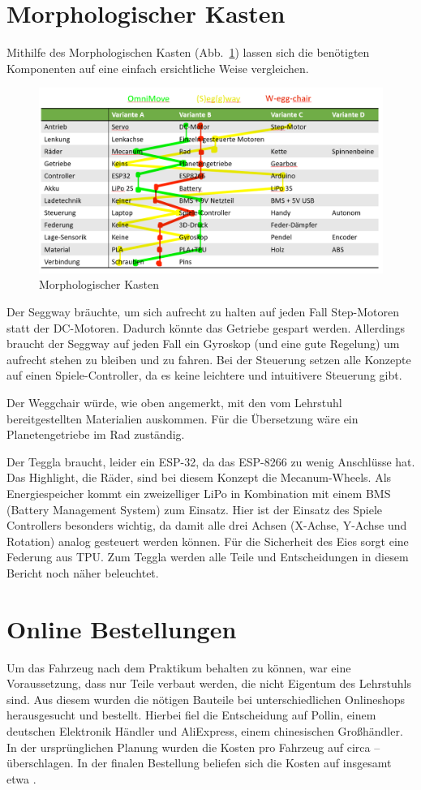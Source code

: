 \section{Morphologischer Kasten}
Mithilfe des Morphologischen Kasten (Abb.~\ref{bild:morphkasten}) lassen sich die benötigten Komponenten auf eine einfach ersichtliche Weise vergleichen.
\begin{figure}[H]
	\centering
	\includegraphics[width=\textwidth]{bilder/morphkasten.png}
	\caption{Morphologischer Kasten}
	\label{bild:morphkasten}
\end{figure}
Der Seggway bräuchte, um sich aufrecht zu halten auf jeden Fall Step-Motoren statt der DC-Motoren. Dadurch könnte das Getriebe gespart werden. Allerdings braucht der Seggway auf jeden Fall ein Gyroskop (und eine gute Regelung) um aufrecht stehen zu bleiben und zu fahren. Bei der Steuerung setzen alle Konzepte auf einen Spiele-Controller, da es keine leichtere und intuitivere Steuerung gibt.

Der Weggchair würde, wie oben angemerkt, mit den vom Lehrstuhl bereitgestellten Materialien auskommen. Für die Übersetzung wäre ein Planetengetriebe im Rad zuständig. 

Der Teggla braucht, leider ein ESP-32, da das ESP-8266 zu wenig Anschlüsse hat. Das Highlight, die Räder, sind bei diesem Konzept die Mecanum-Wheels. Als Energiespeicher kommt ein zweizelliger LiPo in Kombination mit einem BMS (Battery Management System) zum Einsatz. Hier ist der Einsatz des Spiele Controllers besonders wichtig, da damit alle drei Achsen (X-Achse, Y-Achse und Rotation) analog gesteuert werden können. Für die Sicherheit des Eies sorgt eine Federung aus TPU. Zum Teggla werden alle Teile und Entscheidungen in diesem Bericht noch näher beleuchtet. 



\section{Online Bestellungen}
Um das Fahrzeug nach dem Praktikum behalten zu können, war eine Voraussetzung, dass nur Teile verbaut werden, die nicht Eigentum des Lehrstuhls sind.
Aus diesem wurden die nötigen Bauteile bei unterschiedlichen Onlineshops herausgesucht und bestellt.
Hierbei fiel die Entscheidung auf Pollin, einem deutschen Elektronik Händler und AliExpress, einem chinesischen Großhändler.
In der ursprünglichen Planung wurden die Kosten pro Fahrzeug auf circa  --  überschlagen.
In der finalen Bestellung beliefen sich die Kosten auf insgesamt etwa .

